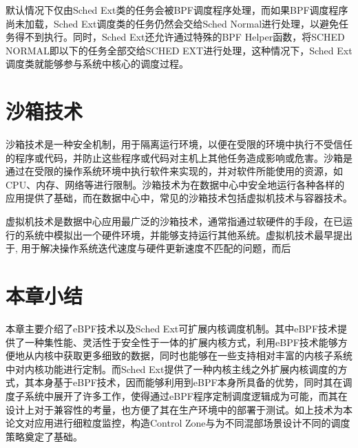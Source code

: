 默认情况下仅由Sched Ext类的任务会被BPF调度程序处理，而如果BPF调度程序尚未加载，Sched Ext调度类的任务仍然会交给Sched Normal进行处理，以避免任务得不到执行。同时，Sched Ext还允许通过特殊的BPF Helper函数，将SCHED NORMAL即以下的任务全部交给SCHED EXT进行处理，这种情况下，Sched Ext调度类就能够参与系统中核心的调度过程。

\section{沙箱技术}


沙箱技术是一种安全机制，用于隔离运行环境，以便在受限的环境中执行不受信任的程序或代码，并防止这些程序或代码对主机上其他任务造成影响或危害。沙箱是通过在受限的操作系统环境中执行软件来实现的，并对软件所能使用的资源，如CPU、内存、网络等进行限制。沙箱技术为在数据中心中安全地运行各种各样的应用提供了基础，而在数据中心中，常见的沙箱技术包括虚拟机技术与容器技术。

虚拟机技术是数据中心应用最广泛的沙箱技术，通常指通过软硬件的手段，在已运行的系统中模拟出一个硬件环境，并能够支持运行其他系统。虚拟机技术最早提出于\citep{bugnion1997disco}, 用于解决操作系统迭代速度与硬件更新速度不匹配的问题，而后

\section{本章小结}

本章主要介绍了eBPF技术以及Sched Ext可扩展内核调度机制。其中eBPF技术提供了一种集性能、灵活性于安全性于一体的扩展内核方式，利用eBPF技术能够方便地从内核中获取更多细致的数据，同时也能够在一些支持相对丰富的内核子系统中对内核功能进行定制。而Sched Ext提供了一种内核主线之外扩展内核调度的方式，其本身基于eBPF技术，因而能够利用到eBPF本身所具备的优势，同时其在调度子系统中展开了许多工作，使得通过eBPF程序定制调度逻辑成为可能，而其在设计上对于兼容性的考量，也方便了其在生产环境中的部署于测试。如上技术为本论文对应用进行细粒度监控，构造Control Zone与为不同混部场景设计不同的调度策略奠定了基础。